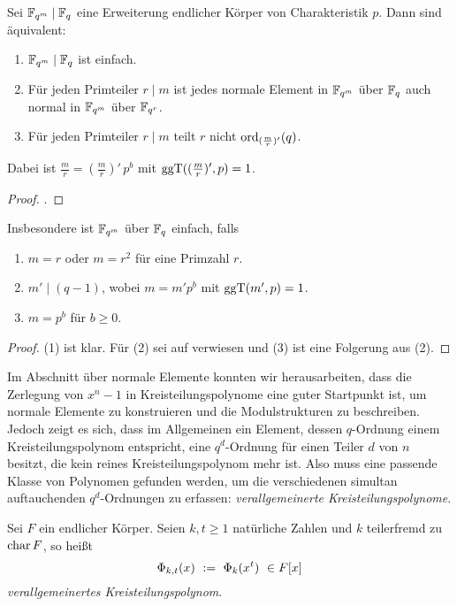 \begin{satz}
  \label{satz:einfache_erweiterungen}
  Sei $\mathbb{F}_{q^m} \mid \mathbb{F}_q$ eine Erweiterung endlicher Körper
  von Charakteristik $p$. Dann sind äquivalent:
  \begin{enumerate}
    \item $\mathbb{F}_{q^m} \mid \mathbb{F}_q$ ist einfach.
    \item Für jeden Primteiler $r \mid m$ ist jedes normale Element in 
      $\mathbb{F}_{q^m}$ über $\mathbb{F}_q$ auch normal in $\mathbb{F}_{q^m}$ über $\mathbb{F}_{q^r}$.
    \item Für jeden Primteiler $r \mid m$ teilt $r$ nicht
      $\operatorname{ord}_{(\frac m r)'}(q)$.
  \end{enumerate}
  Dabei ist $\tfrac m r = (\tfrac m r)'\,p^b$ mit $\operatorname{ggT}((\tfrac m r)',p) = 1$.
\end{satz}
\begin{proof}
  \autocite[Corollary 15.8]{hachenberger1997finite}.
\end{proof}

\begin{kor}
  \label{kor:einfache_erweiterungen}
  Insbesondere ist $\mathbb{F}_{q^m}$ über $\mathbb{F}_q$ einfach, falls
  \begin{enumerate}
    \item $m = r$ oder $m=r^2$ für eine Primzahl $r$.
    \item $m' \mid (q-1)$, wobei $m=m'p^b$ mit $\operatorname{ggT}(m',p) = 1$.
    \item $m = p^b$ für $b\geq 0$.
  \end{enumerate}
\end{kor}
\begin{proof}
  (1) ist klar. Für (2) sei auf \autocite[Theorem 15.9]{hachenberger1997finite}
  verwiesen und (3) ist eine Folgerung aus (2).
\end{proof}

Im Abschnitt über normale Elemente konnten wir herausarbeiten, dass die
Zerlegung von $x^n-1$ in Kreisteilungspolynome eine guter Startpunkt ist, um
normale Elemente zu konstruieren und die Modulstrukturen zu beschreiben. Jedoch
zeigt es sich, dass im Allgemeinen ein Element, dessen $q$-Ordnung einem
Kreisteilungspolynom entspricht, eine $q^d$-Ordnung für einen Teiler $d$ von
$n$ besitzt, die kein reines Kreisteilungspolynom mehr ist. 
Also muss eine passende Klasse von Polynomen gefunden werden, um die
verschiedenen simultan auftauchenden $q^d$-Ordnungen zu erfassen: 
\emph{verallgemeinerte Kreisteilungspolynome}.

\begin{definition}
  Sei $F$ ein endlicher Körper. Seien $k,t\geq 1$ natürliche Zahlen und 
  $k$ teilerfremd zu $\operatorname{char} F$, so heißt
  \[ \Phi_{k,t}(x) \ :=\  \Phi_k(x^t) \ \in F[x]\]
  \emph{verallgemeinertes Kreisteilungspolynom}.
\end{definition}


